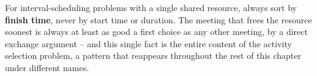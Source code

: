 \begin{takeawaybox}
For interval-scheduling problems with a single shared resource, always sort
by \textbf{finish time}, never by start time or duration. The meeting that
frees the resource soonest is always at least as good a first choice as any
other meeting, by a direct exchange argument -- and this single fact is the
entire content of the activity selection problem, a pattern that reappears
throughout the rest of this chapter under different names.
\end{takeawaybox}
